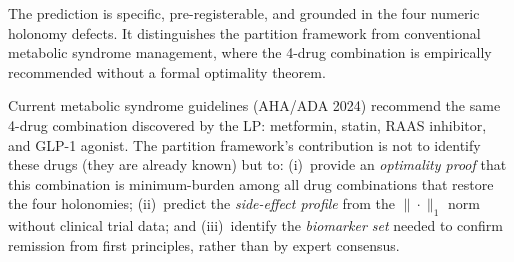 The prediction is specific, pre-registerable, and grounded in the four
numeric holonomy defects.  It distinguishes the partition framework from
conventional metabolic syndrome management, where the 4-drug combination is
empirically recommended without a formal optimality theorem.

\begin{remark}
\label{rem:ch09-metsyn-soc}
Current metabolic syndrome guidelines (AHA/ADA 2024) recommend the same
4-drug combination discovered by the LP: metformin, statin, RAAS inhibitor,
and GLP-1 agonist.  The partition framework's contribution is not to
identify these drugs (they are already known) but to:
(i)~provide an \emph{optimality proof} that this combination is
minimum-burden among all drug combinations that restore the four holonomies;
(ii)~predict the \emph{side-effect profile} from the $\|\cdot\|_1$ norm
without clinical trial data; and
(iii)~identify the \emph{biomarker set} needed to confirm remission from
first principles, rather than by expert consensus.
\end{remark}

